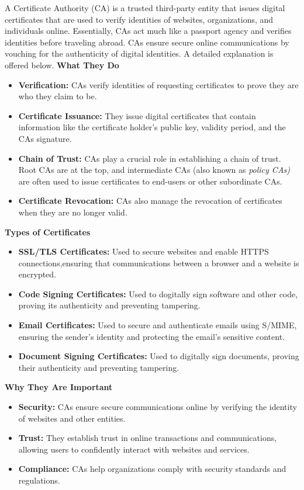  A Certificate Authority (CA) is a trusted third-party entity that issues digital certificates that are used to verify identities of websites, organizations, and individuals online. Essentially, CAs act much like a passport agency and verifies identities before traveling abroad. CAs ensure secure online communications by vouching for the authenticity of digital identities. A detailed explanation is offered below.
\textbf{What They Do}
\begin{itemize}
    \item \textbf{Verification:} CAs verify identities of requesting certificates to prove they are who they claim to be.
    \item \textbf{Certificate Issuance:} They issue digital certificates that contain information like the certificate holder's public key, validity period, and the CAs signature.
    \item \textbf{Chain of Trust:} CAs play a crucial role in establishing a chain of trust. Root CAs are at the top, and intermediate CAs (also known as \textit{policy CAs)} are often used to issue certificates to end-users or other subordinate CAs.
    \item \textbf{Certificate Revocation:} CAs also manage the revocation of certificates when they are no longer valid.
 \end{itemize}
\textbf{Types of Certificates}
\begin{itemize}
    \item \textbf{SSL/TLS Certificates:} Used to secure websites and enable HTTPS connections,ensuring that communications between a browser and a website is encrypted.
    \item \textbf{Code Signing Certificates:} Used to dogitally sign software and other code, proving its authenticity and preventing tampering.
    \item \textbf{Email Certificates:} Used to secure and authenticate emails using S/MIME, ensuring the sender's identity and protecting the email's sensitive content.
    \item \textbf{Document Signing Certificates:} Used to digitally sign documents, proving their authenticity and preventing tampering.
\end{itemize}
\textbf{Why They Are Important}
\begin{itemize}
\item \textbf{Security:} CAs ensure secure communications online by verifying the identity of websites and other entities.
\item \textbf{Trust:} They establish trust in online transactions and communications, allowing users to confidently interact with websites and services.
\item \textbf{Compliance:} CAs help organizations comply with security standards and regulations.
\end{itemize}
